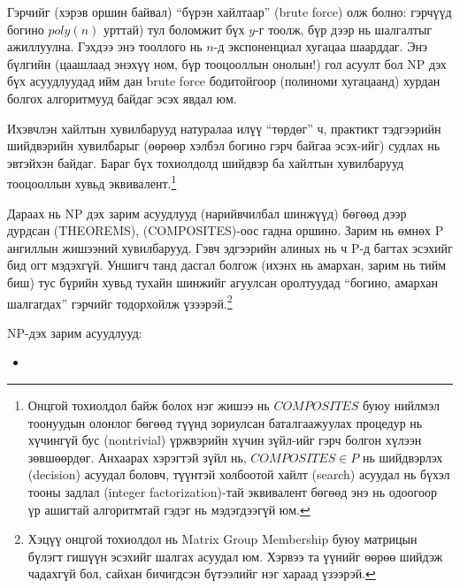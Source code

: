 Гэрчийг (хэрэв оршин байвал) “бүрэн хайлтаар” (brute force) олж болно: гэрчүүд богино $poly(n)$ урттай) тул боломжит бүх $y$-г тоолж, бүр дээр нь шалгалтыг ажиллуулна. Гэхдээ энэ тооллого нь $n$-д экспоненциал хугацаа шаарддаг. Энэ бүлгийн (цаашлаад энэхүү ном, бүр тооцооллын онолын!) гол асуулт бол NP дэх бүх асуудлуудад ийм дан brute force бодитойгоор (полиноми хугацаанд) хурдан болгох алгоритмууд байдаг эсэх явдал юм.


Ихэвчлэн хайлтын хувилбарууд натуралаа илүү “төрдөг” ч, практикт тэдгээрийн шийдвэрийн хувилбарыг (өөрөөр хэлбэл богино гэрч байгаа эсэх-ийг) судлах нь эвтэйхэн байдаг. Бараг бүх тохиолдолд шийдвэр ба хайлтын хувилбарууд тооцооллын хувьд эквивалент.\footnote{Онцгой тохиолдол байж болох нэг жишээ нь $COMPOSITES$ буюу нийлмэл тоонуудын олонлог бөгөөд түүнд зориулсан баталгаажуулах процедур нь хүчингүй бус (nontrivial) үржвэрийн хүчин зүйл-ийг гэрч болгон хүлээн зөвшөөрдөг.
Анхаарах хэрэгтэй зүйл нь, $COMPOSITES \in P$ нь шийдвэрлэх (decision) асуудал боловч, түүнтэй холбоотой хайлт (search) асуудал нь бүхэл тооны задлал (integer factorization)-тай эквивалент бөгөөд энэ нь одоогоор үр ашигтай алгоритмтай гэдэг нь мэдэгдээгүй юм.}


Дараах нь NP дэх зарим асуудлууд (нарийвчилбал шинжүүд) бөгөөд дээр дурдсан (\textsc{THEOREMS}), (\textsc{COMPOSITES})-оос гадна оршино. Зарим нь өмнөх P ангиллын жишээний хувилбарууд. Гэвч эдгээрийн алиных нь ч P-д багтах эсэхийг бид огт мэдэхгүй. Уншигч танд дасгал болгож (ихэнх нь амархан, зарим нь тийм биш) тус бүрийн хувьд тухайн шинжийг агуулсан оролтуудад “богино, амархан шалгагдах” гэрчийг тодорхойлж үзээрэй.\footnote{Хэцүү онцгой тохиолдол нь Matrix Group Membership буюу матрицын бүлэгт гишүүн эсэхийг шалгах асуудал юм. Хэрвээ та үүнийг өөрөө шийдэж чадахгүй бол, сайхан бичигдсэн \cite{BS84} бүтээлийг нэг хараад үзээрэй.}


NP-дэх зарим асуудлууд:
\begin{itemize}
  \item
\end{itemize}
